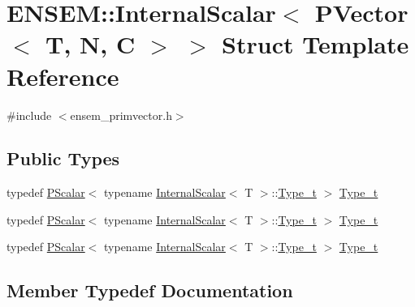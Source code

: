 \hypertarget{structENSEM_1_1InternalScalar_3_01PVector_3_01T_00_01N_00_01C_01_4_01_4}{}\section{E\+N\+S\+EM\+:\+:Internal\+Scalar$<$ P\+Vector$<$ T, N, C $>$ $>$ Struct Template Reference}
\label{structENSEM_1_1InternalScalar_3_01PVector_3_01T_00_01N_00_01C_01_4_01_4}


{\ttfamily \#include $<$ensem\+\_\+primvector.\+h$>$}

\subsection*{Public Types}
\begin{DoxyCompactItemize}
\item 
typedef \mbox{\hyperlink{classENSEM_1_1PScalar}{P\+Scalar}}$<$ typename \mbox{\hyperlink{structENSEM_1_1InternalScalar}{Internal\+Scalar}}$<$ T $>$\+::\mbox{\hyperlink{structENSEM_1_1InternalScalar_3_01PVector_3_01T_00_01N_00_01C_01_4_01_4_a3d48341b473eb19411a82b36c48559cc}{Type\+\_\+t}} $>$ \mbox{\hyperlink{structENSEM_1_1InternalScalar_3_01PVector_3_01T_00_01N_00_01C_01_4_01_4_a3d48341b473eb19411a82b36c48559cc}{Type\+\_\+t}}
\item 
typedef \mbox{\hyperlink{classENSEM_1_1PScalar}{P\+Scalar}}$<$ typename \mbox{\hyperlink{structENSEM_1_1InternalScalar}{Internal\+Scalar}}$<$ T $>$\+::\mbox{\hyperlink{structENSEM_1_1InternalScalar_3_01PVector_3_01T_00_01N_00_01C_01_4_01_4_a3d48341b473eb19411a82b36c48559cc}{Type\+\_\+t}} $>$ \mbox{\hyperlink{structENSEM_1_1InternalScalar_3_01PVector_3_01T_00_01N_00_01C_01_4_01_4_a3d48341b473eb19411a82b36c48559cc}{Type\+\_\+t}}
\item 
typedef \mbox{\hyperlink{classENSEM_1_1PScalar}{P\+Scalar}}$<$ typename \mbox{\hyperlink{structENSEM_1_1InternalScalar}{Internal\+Scalar}}$<$ T $>$\+::\mbox{\hyperlink{structENSEM_1_1InternalScalar_3_01PVector_3_01T_00_01N_00_01C_01_4_01_4_a3d48341b473eb19411a82b36c48559cc}{Type\+\_\+t}} $>$ \mbox{\hyperlink{structENSEM_1_1InternalScalar_3_01PVector_3_01T_00_01N_00_01C_01_4_01_4_a3d48341b473eb19411a82b36c48559cc}{Type\+\_\+t}}
\end{DoxyCompactItemize}


\subsection{Member Typedef Documentation}
\mbox{\label{structENSEM_1_1InternalScalar_3_01PVector_3_01T_00_01N_00_01C_01_4_01_4_a3d48341b473eb19411a82b36c48559cc}} 
